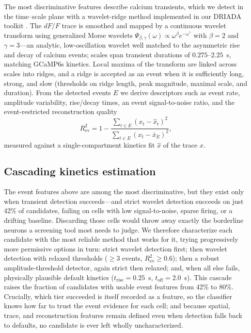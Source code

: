 \documentclass[conference]{IEEEtran}
\begin{document}
The most discriminative features describe calcium transients, which we detect in the time--scale plane with a wavelet-ridge method \cite{Neugornet2021} implemented in our DRIADA toolkit \cite{driada}. The $dF/F$ trace is smoothed and mapped by a continuous wavelet transform using generalized Morse wavelets $\Psi_{\beta,\gamma}(\omega)\propto\omega^{\beta}e^{-\omega^{\gamma}}$ with $\beta=2$ and $\gamma=3$---an analytic, low-oscillation wavelet well matched to the asymmetric rise and decay of calcium events; scales span transient durations of $0.275$--$2.25$~s, matching GCaMP6s kinetics. Local maxima of the transform are linked across scales into ridges, and a ridge is accepted as an event when it is sufficiently long, strong, and slow (thresholds on ridge length, peak magnitude, maximal scale, and duration). From the detected events $E$ we derive descriptors such as event rate, amplitude variability, rise/decay times, an event signal-to-noise ratio, and the event-restricted reconstruction quality
\begin{equation}
R^{2}_{\mathrm{ev}}=1-
   \frac{\sum_{t\in E}(x_t-\hat x_t)^2}
        {\sum_{t\in E}(x_t-\bar x_E)^2},
\label{eq:evr2}
\end{equation}
measured against a single-compartment kinetics fit $\hat x$ of the trace $x$.

\subsection{Cascading kinetics estimation}
\label{sec:cascade}

The event features above are among the most discriminative, but they exist only when transient detection succeeds---and strict wavelet detection succeeds on just 42\% of candidates, failing on cells with low signal-to-noise, sparse firing, or a drifting baseline. Discarding those cells would throw away exactly the borderline neurons a screening tool most needs to judge. We therefore characterize each candidate with the most reliable method that works for it, trying progressively more permissive options in turn: strict wavelet detection first; then wavelet detection with relaxed thresholds ($\ge3$ events, $R^2_{\mathrm{ev}}\ge0.6$); then a robust amplitude-threshold detector, again strict then relaxed; and, when all else fails, physically plausible default kinetics ($t_{\mathrm{rise}}=0.25$~s, $t_{\mathrm{off}}=2.0$~s). This cascade raises the fraction of candidates with usable event features from 42\% to 80\%. Crucially, which tier succeeded is itself recorded as a feature, so the classifier knows how far to trust the event evidence for each cell; and because spatial, trace, and reconstruction features remain defined even when detection falls back to defaults, no candidate is ever left wholly uncharacterized.
\end{document}
